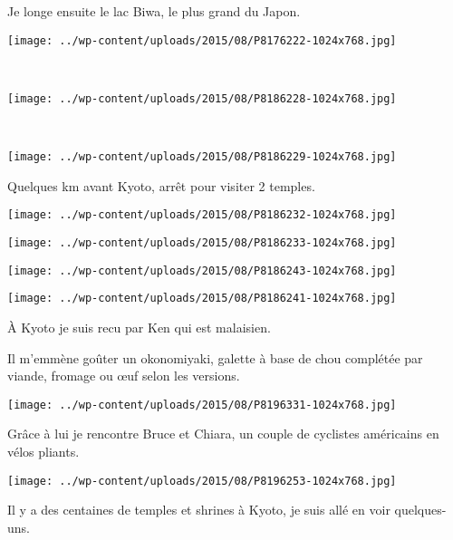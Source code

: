  Je longe ensuite le lac Biwa, le plus grand du Japon.
\begin{center} \texttt{[image: ../wp-content/uploads/2015/08/P8176222-1024x768.jpg]} \end{center}
~
\begin{center} \texttt{[image: ../wp-content/uploads/2015/08/P8186228-1024x768.jpg]} \end{center}
\vspace{-\topsep}
\pagebreak
~
\begin{center} \texttt{[image: ../wp-content/uploads/2015/08/P8186229-1024x768.jpg]} \end{center}

 Quelques km avant Kyoto, arrêt pour visiter 2 temples.
\begin{center} \texttt{[image: ../wp-content/uploads/2015/08/P8186232-1024x768.jpg]} \end{center}
\begin{center} \texttt{[image: ../wp-content/uploads/2015/08/P8186233-1024x768.jpg]} \end{center}
\begin{center} \texttt{[image: ../wp-content/uploads/2015/08/P8186243-1024x768.jpg]} \end{center}
\begin{center} \texttt{[image: ../wp-content/uploads/2015/08/P8186241-1024x768.jpg]} \end{center}

 \`A Kyoto je suis recu par Ken qui est malaisien. 

 Il m'emmène goûter un okonomiyaki, galette à base de chou complétée par viande, fromage ou \oe{}uf selon les versions. 
\begin{center} \texttt{[image: ../wp-content/uploads/2015/08/P8196331-1024x768.jpg]} \end{center}
\vspace{-\topsep}
\pagebreak
 
 Grâce à lui je rencontre Bruce et Chiara, un couple de cyclistes américains en vélos pliants. 
\begin{center} \texttt{[image: ../wp-content/uploads/2015/08/P8196253-1024x768.jpg]} \end{center}

 Il y a des centaines de temples et shrines à Kyoto, je suis allé en voir quelques-uns. 

